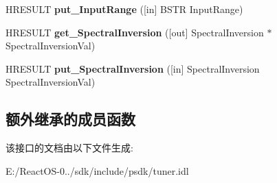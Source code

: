 \begin{DoxyCompactItemize}
H\+R\+E\+S\+U\+LT {\bfseries put\+\_\+\+Input\+Range} (\mbox{[}in\mbox{]} B\+S\+TR Input\+Range)
\item 
\mbox{\label{interface_i_d_v_b_s_tuning_space_a01affbb24f45391dd3b734581367c742}} 
H\+R\+E\+S\+U\+LT {\bfseries get\+\_\+\+Spectral\+Inversion} (\mbox{[}out\mbox{]} Spectral\+Inversion $\ast$Spectral\+Inversion\+Val)
\item 
\mbox{\label{interface_i_d_v_b_s_tuning_space_a28490f32f18dddcd382e80dbbfc714e8}} 
H\+R\+E\+S\+U\+LT {\bfseries put\+\_\+\+Spectral\+Inversion} (\mbox{[}in\mbox{]} Spectral\+Inversion Spectral\+Inversion\+Val)
\end{DoxyCompactItemize}
\subsection*{额外继承的成员函数}


该接口的文档由以下文件生成\+:\begin{DoxyCompactItemize}
\item 
E\+:/\+React\+O\+S-\/0../sdk/include/psdk/tuner.\+idl\end{DoxyCompactItemize}
